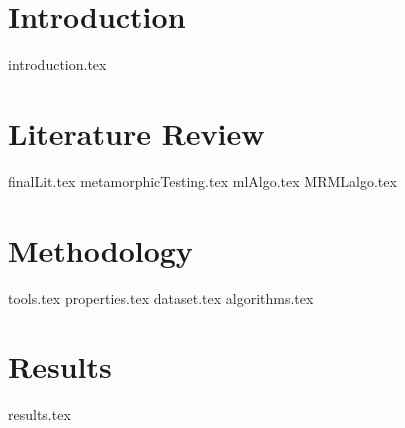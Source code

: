 \documentclass[print,ms]{unothesis}
\begin{document}

\setlength{\beforechapskip}{-40pt} %
\renewcommand*\contentsname{Table of Contents}
\tableofcontents  %
\listoffigures
\listoftables

\mainmatter


\chapter{Introduction}
{introduction.tex}
% 

\chapter{Literature Review}
{finalLit.tex}
{metamorphicTesting.tex}
{mlAlgo.tex}
{MRMLalgo.tex}

\chapter{Methodology}
{tools.tex}
{properties.tex}
{dataset.tex}
{algorithms.tex}



\chapter{Results}
{results.tex}
\end{document}
